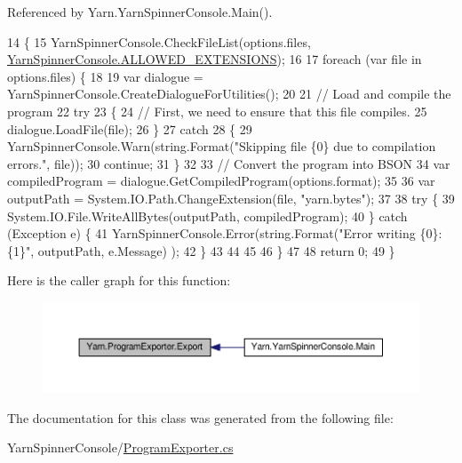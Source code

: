 Referenced by Yarn.\-Yarn\-Spinner\-Console.\-Main().


\begin{DoxyCode}
14         \{
15             YarnSpinnerConsole.CheckFileList(options.files, 
      \hyperlink{a00185_a0979de7ea02c8c0375b8220a12e6575e}{YarnSpinnerConsole.ALLOWED\_EXTENSIONS});
16 
17             \textcolor{keywordflow}{foreach} (var file \textcolor{keywordflow}{in} options.files) \{
18 
19                 var dialogue = YarnSpinnerConsole.CreateDialogueForUtilities();
20 
21                 \textcolor{comment}{// Load and compile the program}
22                 \textcolor{keywordflow}{try}
23                 \{
24                     \textcolor{comment}{// First, we need to ensure that this file compiles.}
25                     dialogue.LoadFile(file);
26                 \}
27                 \textcolor{keywordflow}{catch}
28                 \{
29                     YarnSpinnerConsole.Warn(string.Format(\textcolor{stringliteral}{"Skipping file \{0\} due to compilation errors."}, 
      file));
30                     \textcolor{keywordflow}{continue};
31                 \}
32 
33                 \textcolor{comment}{// Convert the program into BSON}
34                 var compiledProgram = dialogue.GetCompiledProgram(options.format);
35 
36                 var outputPath = System.IO.Path.ChangeExtension(file, \textcolor{stringliteral}{"yarn.bytes"});
37 
38                 \textcolor{keywordflow}{try} \{
39                     System.IO.File.WriteAllBytes(outputPath, compiledProgram);
40                 \} \textcolor{keywordflow}{catch} (Exception e) \{
41                     YarnSpinnerConsole.Error(string.Format(\textcolor{stringliteral}{"Error writing \{0\}: \{1\}"}, outputPath, e.Message)
      );
42                 \}
43 
44 
45 
46             \}
47 
48             \textcolor{keywordflow}{return} 0;
49         \}
\end{DoxyCode}


Here is the caller graph for this function\-:
\nopagebreak
\begin{figure}[H]
\begin{center}
\leavevmode
\includegraphics[width=350pt]{a00143_a3679a1f144471ea411fed34f6a79a18d_icgraph}
\end{center}
\end{figure}




The documentation for this class was generated from the following file\-:\begin{DoxyCompactItemize}
\item 
Yarn\-Spinner\-Console/\hyperlink{a00308}{Program\-Exporter.\-cs}\end{DoxyCompactItemize}
